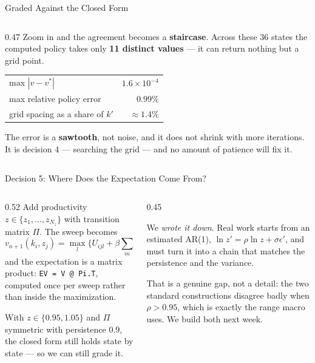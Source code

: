 \begin{frame}{Graded Against the Closed Form}
\begin{columns}[c]
\begin{column}{0.47\textwidth}
\small
Zoom in and the agreement becomes a \textbf{staircase}. Across these 36 states the computed policy takes only \textbf{11 distinct values} --- it can return nothing but a grid point.
\medskip
\begin{center}\footnotesize
\begin{tabular}{@{}lr@{}}
\toprule
max $|v-v^*|$ & $1.6\times10^{-4}$ \\
max relative policy error & $0.99\%$ \\
grid spacing as a share of $k'$ & $\approx1.4\%$ \\
\bottomrule
\end{tabular}
\end{center}
\medskip
\begin{cautionbox}\footnotesize
The error is a \textbf{sawtooth}, not noise, and it does not shrink with more iterations. It is decision 4 --- searching the grid --- and no amount of patience will fix it.
\end{cautionbox}
\end{column}
\end{columns}
\end{frame}

\begin{frame}{Decision 5: Where Does the Expectation Come From?}
\begin{columns}[T]
\begin{column}{0.52\textwidth}
\small
Add productivity $z\in\{z_1,\dots,z_{N_z}\}$ with transition matrix $\Pi$. The sweep becomes
\[
  v_{n+1}(k_i,z_j)=\max_{l}\Big\{U_{ijl}+\beta\sum_{m}\Pi_{jm}v_n(k_l,z_m)\Big\},
\]
and the expectation is a matrix product: \texttt{EV = V @ Pi.T}, computed once per sweep rather than inside the maximization.
\medskip

With $z\in\{0.95,1.05\}$ and $\Pi$ symmetric with persistence $0.9$, the closed form still holds state by state --- so we can still grade it.
\end{column}
\begin{column}{0.45\textwidth}
\begin{cautionbox}[title=\textbf{But where did $\Pi$ come from?}]\footnotesize
We \emph{wrote it down}. Real work starts from an estimated AR(1),
$\ln z'=\rho\ln z+\sigma\epsilon'$, and must turn it into a chain that matches the persistence and the variance.
\end{cautionbox}
\medskip
\begin{examplebox}\footnotesize
That is a genuine gap, not a detail: the two standard constructions disagree badly when $\rho>0.95$, which is exactly the range macro uses. We build both next week.
\end{examplebox}
\end{column}
\end{columns}
\vspace{1mm}
\end{frame}

